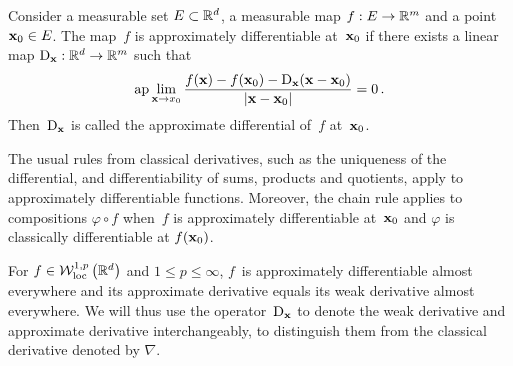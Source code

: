 \begin{definition}\label{def:approximatediff}
Consider a measurable set $E\subset \mathbb{R}^d$, a measurable map $f:E\rightarrow \mathbb{R}^m$ and a point $\boldsymbol{\mathrm{x}}_0\in E$. 
The map~$f$ is approximately differentiable at~$\boldsymbol{\mathrm{x}}_0$ if there exists a linear map $\mathrm{D}_{\boldsymbol{\mathrm{x}}}:\mathbb{R}^d\rightarrow\mathbb{R}^m$ such that
\[
\mathrm{ap}\lim_{\mathbf{x} \rightarrow x_{0}} \frac{f(\mathbf{x})-f(\boldsymbol{\mathrm{x}}_{0})-\mathrm{D}_{\boldsymbol{\mathrm{x}}}(\mathbf{x}-\boldsymbol{\mathrm{x}}_{0})}{|\mathbf{x}-\boldsymbol{\mathrm{x}}_{0}|}=0\,.
\]
Then~$\mathrm{D}_{\boldsymbol{\mathrm{x}}}$ is called the approximate differential of~$f$ at~$\boldsymbol{\mathrm{x}}_0$.
\end{definition}
\begin{remark}\label{rem:usualdiffrules}
The usual rules from classical derivatives, such as the uniqueness of the differential, and differentiability of sums, products and quotients, apply to approximately differentiable functions. 
Moreover, the chain rule applies to compositions $\varphi\circ f$ when~$f$ is approximately differentiable at~$\boldsymbol{\mathrm{x}}_0$ and $\varphi$ is classically differentiable at $f(\boldsymbol{\mathrm{x}}_0)$.
\end{remark}
\begin{remark}\label{rem:approxweakeq}
For $f\in \mathcal{W}_{\mathrm{loc}}^{1, p}\left(\mathbb{R}^{d}\right)$ and ${1 \leq p \leq \infty}$, $f$~is approximately differentiable almost everywhere and its approximate derivative equals its weak derivative almost everywhere. 
We will thus use the operator~$\mathrm{D}_{\boldsymbol{\mathrm{x}}}$ to denote the weak derivative and approximate derivative interchangeably, to distinguish them from the classical derivative denoted by $\nabla$.
\end{remark}

